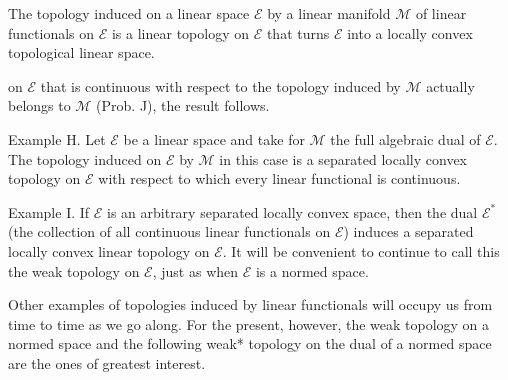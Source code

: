 The topology induced on a linear space $\mathcal{E}$ by a linear manifold $\mathcal{M}$ of linear functionals on $\mathcal{E}$ is a linear topology on $\mathcal{E}$ that turns $\mathcal{E}$ into a locally convex topological linear space.

on $\mathcal{E}$ that is continuous with respect to the topology induced by $\mathcal{M}$ actually belongs to $\mathcal{M}$ (Prob. J), the result follows.

Example H. Let $\mathcal{E}$ be a linear space and take for $\mathcal{M}$ the full algebraic dual of $\mathcal{E}$. The topology induced on $\mathcal{E}$ by $\mathcal{M}$ in this case is a separated locally convex topology on $\mathcal{E}$ with respect to which every linear functional is continuous.

Example I. If $\mathcal{E}$ is an arbitrary separated locally convex space, then the dual $\mathcal{E}^*$ (the collection of all continuous linear functionals on $\mathcal{E}$) induces a separated locally convex linear topology on $\mathcal{E}$. It will be convenient to continue to call this the weak topology on $\mathcal{E}$, just as when $\mathcal{E}$ is a normed space.

Other examples of topologies induced by linear functionals will occupy us from time to time as we go along. For the present, however, the weak topology on a normed space and the following weak* topology on the dual of a normed space are the ones of greatest interest.
